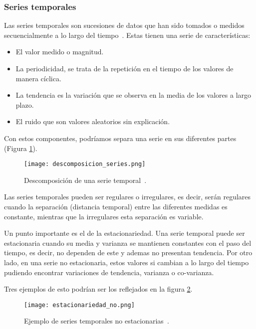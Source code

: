\subsubsection{Series temporales}
Las series temporales son sucesiones de datos que han sido tomados o medidos  secuencialmente a lo largo del tiempo~\cite{SeriesTempUBU}.
Estas tienen una serie de características:
\begin{itemize}
	\item El valor medido o magnitud.
	\item La periodicidad, se trata de la repetición en el tiempo de los valores de manera cíclica.
	\item La tendencia es la variación que se observa en la media de los valores a largo plazo.
	\item El ruido que son valores aleatorios sin explicación.
\end{itemize}

Con estos componentes, podríamos separa una serie en sus diferentes partes (Figura \ref{descomposicion_series}).

\begin{figure}%
	\centering
	\texttt{[image: descomposicion\_series.png]}
	\caption[Descomposición de una serie temporal]{Descomposición de una serie temporal~\cite{SeriesTemp}.}\label{descomposicion_series}
\end{figure}

Las series temporales pueden ser regulares o irregulares, es decir, serán regulares cuando la separación (distancia temporal) entre las diferentes medidas es constante, mientras que la irregulares esta separación es variable.

Un punto importante es el de la estacionariedad. Una serie temporal puede ser estacionaria cuando su media y varianza se mantienen constantes con el paso del tiempo, es decir, no dependen de este y ademas no presentan tendencia. Por otro lado, en una serie no estacionaria, estos valores si cambian a lo largo del tiempo pudiendo encontrar variaciones de tendencia, varianza o co-varianza.

Tres ejemplos de esto podrían ser los reflejados en la figura \ref{series_no_estacionarias}.

\begin{figure}%
	\centering
	\texttt{[image: estacionariedad\_no.png]}
	\caption[Ejemplo de series temporales no estacionarias]{Ejemplo de series temporales no estacionarias~\cite{SeriesTempIMG}.}\label{series_no_estacionarias}
\end{figure}

